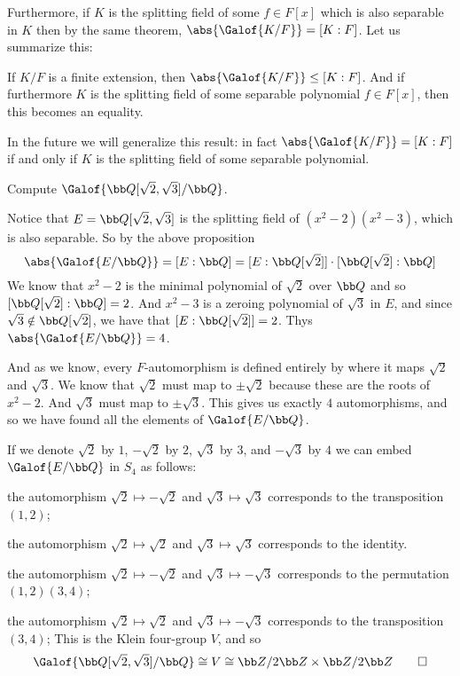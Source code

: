 Furthermore, if $K$ is the splitting field of some $f\in F[x]$ which is also separable in $K$ then by the same theorem, $\abs{\Galof{K/F}}=[K:F]$.
Let us summarize this:

\bprop[name=2to3]

    If $K/F$ is a finite extension, then $\abs{\Galof{K/F}}\leq[K:F]$.
    And if furthermore $K$ is the splitting field of some separable polynomial $f\in F[x]$, then this becomes an equality.

\eprop

In the future we will generalize this result: in fact $\abs{\Galof{K/F}}=[K:F]$ if and only if $K$ is the splitting field of some separable polynomial.

\bexam

    Compute $\Galof{{\bb Q}[\sqrt2,\sqrt3]/{\bb Q}}$.

\eexam

Notice that $E={\bb Q}[\sqrt2,\sqrt3]$ is the splitting field of $(x^2-2)(x^2-3)$, which is also separable.
So by the above proposition
$$ \abs{\Galof{E/{\bb Q}}} = [E:{\bb Q}] = [E:{\bb Q}[\sqrt2]]\cdot[{\bb Q}[\sqrt2]:{\bb Q}] $$
We know that $x^2-2$ is the minimal polynomial of $\sqrt2$ over ${\bb Q}$ and so $[{\bb Q}[\sqrt2]:{\bb Q}]=2$.
And $x^2-3$ is a zeroing polynomial of $\sqrt3$ in $E$, and since $\sqrt3\notin{\bb Q}[\sqrt2]$, we have that $[E:{\bb Q}[\sqrt2]]=2$.
Thys $\abs{\Galof{E/{\bb Q}}}=4$.

And as we know, every $F$-automorphism is defined entirely by where it maps $\sqrt2$ and $\sqrt3$.
We know that $\sqrt2$ must map to $\pm\sqrt2$ because these are the roots of $x^2-2$.
And $\sqrt3$ must map to $\pm\sqrt3$.
This gives us exactly $4$ automorphisms, and so we have found all the elements of $\Galof{E/{\bb Q}}$.

If we denote $\sqrt2$ by $1$, $-\sqrt2$ by $2$, $\sqrt3$ by $3$, and $-\sqrt3$ by $4$ we can embed $\Galof{E/{\bb Q}}$ in $S_4$ as follows:
\benum
    \item the automorphism $\sqrt2\mapsto-\sqrt2$ and $\sqrt3\mapsto\sqrt3$ corresponds to the transposition $(1,2)$;
    \item the automorphism $\sqrt2\mapsto\sqrt2$ and $\sqrt3\mapsto\sqrt3$ corresponds to the identity.
    \item the automorphism $\sqrt2\mapsto-\sqrt2$ and $\sqrt3\mapsto-\sqrt3$ corresponds to the permutation $(1,2)(3,4)$;
    \item the automorphism $\sqrt2\mapsto\sqrt2$ and $\sqrt3\mapsto-\sqrt3$ corresponds to the transposition $(3,4)$;
\eenum
This is the Klein four-group $V$, and so
$$ \Galof{{\bb Q}[\sqrt2,\sqrt3]/{\bb Q}} \cong V \cong {\bb Z}/2{\bb Z}\times{\bb Z}/2{\bb Z} \qed $$

